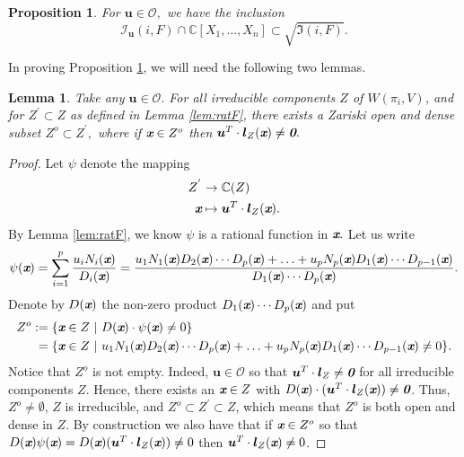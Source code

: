 \documentclass[a4paper]{article}
\def\sO{\mathscr{O}}
\def\bz{\textit{\textbf{0}}}
\def\ub{{\bm u}}
\def\lb{{\bm l}}
\def\xb{\textit{\textbf{x}}}
\def\C{\mathbb{C}}
\def\Wi{W(\pi_i,V)}
\def\Iir{\sqrt{\mathfrak{I}(i,F)}}
\def\Iil{\mathscr{I}_{\ub}(i,F)}
\newtheorem{lemma}[theorem]{Lemma}
\newtheorem{prop}[theorem]{Proposition}
\begin{document}
\begin{prop}\label{prop:polarVs1}
For $\ub \in \mathscr{O},$ we have the inclusion 
\[
\Iil \cap \C[X_1,\hdots,X_n] \subset \Iir.
\]
\end{prop}
%
%
\noindent 
In proving Proposition \ref{prop:polarVs1}, we will need the following two lemmas.
\begin{lemma}\label{lem:3.8}
Take any $\ub \in \mathscr{O}.$ For all irreducible components $Z$ of $\Wi$, and for $Z^{'} \subset Z$ as defined in Lemma \ref{lem:ratF}, there exists a Zariski open and dense subset $Z^o \subset Z^{'},$ where if  $\xb \in Z^o$ then $\ub^T\cdot \lb_{Z}(\xb) \not = \bz.$ 
\end{lemma}
%
\begin{proof}
Let $\psi$ denote the mapping 
\begin{align*}
Z^{'}  &\rightarrow \C(Z)\\    
    \xb &\mapsto \ub^T \cdot \lb_{Z}(\xb).    
\end{align*}
 By Lemma \ref{lem:ratF}, we know $\psi$ is a rational function in $\xb.$ Let us write 
\[
\psi(\xb) = \sum_{i=1}^p\frac{u_iN_{i}(\xb)}{D_{i}(\xb)}
= \frac{u_1N_1(\xb)D_2(\xb)\cdots D_p(\xb) + \hdots + u_pN_p(\xb)D_1(\xb)\cdots D_{p-1}(\xb)}{D_1(\xb) \cdots D_p(\xb)}
. 
\]
Denote by $D(\xb)$ the non-zero product $D_1(\xb) \cdots D_p(\xb)$ and put  
\begin{align*}
Z^o := \{\xb \in Z~&|~D(\xb)\cdot \psi(\xb) \not = 0\} \\
= \{\xb \in Z~&|~u_1N_1(\xb)D_2(\xb)\cdots D_p(\xb) + \hdots + u_pN_p(\xb)D_1(\xb)\cdots D_{p-1}(\xb) \not = 0\}.
\end{align*}
Notice that $Z^{o}$ is not empty. Indeed, $\ub \in \sO$ so that $\bm u^T \cdot {\lb}_Z \not = \bz$ for all irreducible components $Z$. Hence, there exists an $\xb \in Z$ with $D(\xb)\cdot (\bm u^T \cdot {\lb}_Z(\xb)) \not = \bz$. Thus,  $Z^o \not = \emptyset$, $Z$ is irreducible, and $Z^o \subset Z^{'} \subset Z$, which means that $Z^o$ is both open and dense in $Z$.  By construction we also have that if $\xb \in Z^o$ so that $D({\xb})\psi(\xb) = D({\xb})(\ub^T \cdot \lb_Z(\xb))\not = 0$ then $\ub^T \cdot \lb_{Z}(\xb)\not = 0$.
\end{proof}
\end{document}
